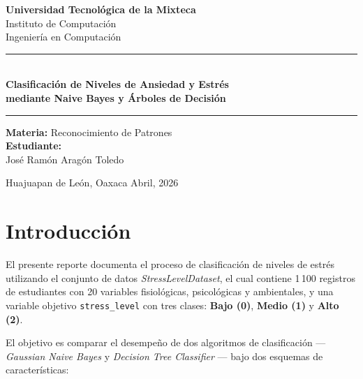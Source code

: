 \documentclass[12pt, letterpaper]{article}
\begin{document}
\begin{titlepage}
    \centering
    \vspace*{1.5cm}

    {\Large \textbf{Universidad Tecnológica de la Mixteca}}\\[0.3cm]
    {\large Instituto de Computación}\\[0.2cm]
    {\large Ingeniería en Computación}

    \vspace{1.5cm}
    \rule{\linewidth}{0.5pt}\\[0.4cm]
    {\LARGE \textbf{Clasificación de Niveles de Ansiedad y Estrés\\
    mediante Naive Bayes y Árboles de Decisión}}\\[0.4cm]
    \rule{\linewidth}{0.5pt}

    \vspace{1.5cm}
    {\large \textbf{Materia:} Reconocimiento de Patrones}\\[0.6cm]

    \vspace{1cm}
    {\large \textbf{Estudiante:}}\\[0.3cm]
    {\large José Ramón Aragón Toledo}

    \vfill
    {\large Huajuapan de León, Oaxaca \hfill Abril, 2026}
\end{titlepage}

\tableofcontents
\newpage

\section{Introducción}

El presente reporte documenta el proceso de clasificación de niveles de estrés
utilizando el conjunto de datos \textit{StressLevelDataset}, el cual contiene
1\,100 registros de estudiantes con 20 variables fisiológicas, psicológicas y
ambientales, y una variable objetivo \texttt{stress\_level} con tres clases:
\textbf{Bajo (0)}, \textbf{Medio (1)} y \textbf{Alto (2)}.

El objetivo es comparar el desempeño de dos algoritmos de clasificación —
\textit{Gaussian Naive Bayes} y \textit{Decision Tree Classifier} — bajo dos
esquemas de características:
\end{document}
